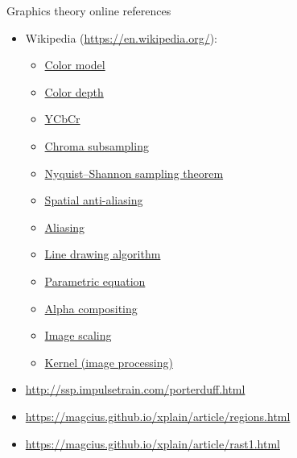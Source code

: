 \begin{frame}{Graphics theory online references}
  \small
  \begin{itemize}
  \item Wikipedia (\url{https://en.wikipedia.org/}):
    \begin{itemize}
    \item \href{https://en.wikipedia.org/wiki/Color_model}{Color model}
    \item \href{https://en.wikipedia.org/wiki/Color_depth}{Color depth}
    \item \href{https://en.wikipedia.org/wiki/YCbCr}{YCbCr}
    \item \href{https://en.wikipedia.org/wiki/Chroma_subsampling}{Chroma subsampling}
    \item \href{https://en.wikipedia.org/wiki/Nyquist–Shannon_sampling_theorem}{Nyquist–Shannon sampling theorem}
    \item \href{https://en.wikipedia.org/wiki/Spatial_anti-aliasing}{Spatial anti-aliasing}
    \item \href{https://en.wikipedia.org/wiki/Aliasing}{Aliasing}
    \item \href{https://en.wikipedia.org/wiki/Line_drawing_algorithm}{Line drawing algorithm}
    \item \href{https://en.wikipedia.org/wiki/Parametric_equation}{Parametric equation}
    \item \href{https://en.wikipedia.org/wiki/Alpha_compositing}{Alpha compositing}
    \item \href{https://en.wikipedia.org/wiki/Image_scaling}{Image scaling}
    \item \href{https://en.wikipedia.org/wiki/Kernel_(image_processing)}{Kernel (image processing)}
    \end{itemize}
  \item \url{http://ssp.impulsetrain.com/porterduff.html}
  \item \url{https://magcius.github.io/xplain/article/regions.html}
  \item \url{https://magcius.github.io/xplain/article/rast1.html}
  \end{itemize}
\end{frame}

